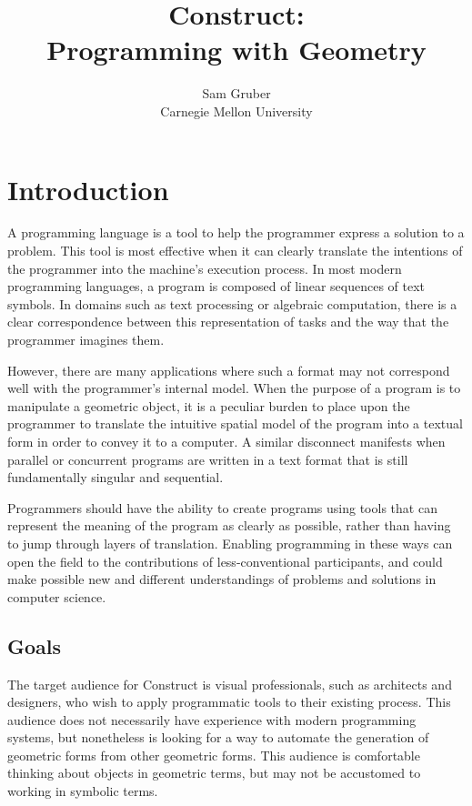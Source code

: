 \documentclass[twoside,openright,11pt]{report}
\title{\bf {\Huge Construct}:\\{\LARGE Programming with Geometry}}
\author{{\Large Sam Gruber}\\Carnegie Mellon University}
\begin{document}
\maketitle

\chapter{Introduction}
\label{chap:intro}

A programming language is a tool to help the programmer express a solution to a problem.
This tool is most effective when it can clearly translate the intentions of the programmer into the machine's execution process. 
In most modern programming languages, a program is composed of linear sequences of text symbols.
In domains such as text processing or algebraic computation, there is a clear correspondence between this representation of tasks and the way that the programmer imagines them.

However, there are many applications where such a format may not correspond well with the programmer's internal model. 
When the purpose of a program is to manipulate a geometric object, it is a peculiar burden to place upon the programmer to translate the intuitive spatial model of the program into a textual form in order to convey it to a computer. 
A similar disconnect manifests when parallel or concurrent programs are written in a text format that is still fundamentally singular and sequential.

Programmers should have the ability to create programs using tools that can represent the meaning of the program as clearly as possible, rather than having to jump through layers of translation. 
Enabling programming in these ways can open the field to the contributions of less-conventional participants, and could make possible new and different understandings of problems and solutions in computer science.

\section{Goals}
\label{sec:goals}

The target audience for Construct is visual professionals, such as architects and designers, who wish to apply programmatic tools to their existing process.
This audience does not necessarily have experience with modern programming systems, but nonetheless is looking for a way to automate the generation of geometric forms from other geometric forms.
This audience is comfortable thinking about objects in geometric terms, but may not be accustomed to working in symbolic terms.
\end{document}

